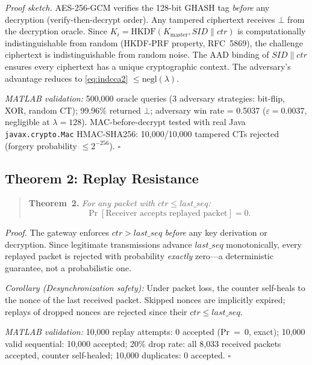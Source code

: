 \documentclass[conference]{IEEEtran}
\newcommand{\Kmaster}{K_{\mathrm{master}}}
\newcommand{\SID}{\mathit{SID}}
\begin{document}
\textit{Proof sketch.} AES-256-GCM verifies the 128-bit GHASH tag
\emph{before} any decryption (verify-then-decrypt order). Any tampered
ciphertext receives $\bot$ from the decryption oracle. Since
$K_i = \text{HKDF}(\Kmaster, \SID \| ctr)$ is computationally
indistinguishable from random (HKDF-PRF property, RFC~5869), the
challenge ciphertext is indistinguishable from random noise. The AAD
binding of $\SID \| ctr$ ensures every ciphertext has a unique
cryptographic context. The adversary's advantage reduces to
\eqref{eq:indcca2} $\leq \mathrm{negl}(\lambda)$.

\textit{MATLAB validation:} 500,000 oracle queries (3 adversary
strategies: bit-flip, XOR, random CT); 99.96\% returned $\bot$;
adversary win rate = 0.5037 ($\varepsilon = 0.0037$, negligible at
$\lambda = 128$). MAC-before-decrypt tested with real Java
\texttt{javax.crypto.Mac} HMAC-SHA256: 10,000/10,000 tampered CTs
rejected (forgery probability $\leq 2^{-256}$). \hfill$\square$

\subsection{Theorem 2: Replay Resistance}

\begin{quote}
\textbf{Theorem~2.}
\label{thm:replay}
\textit{For any packet with $ctr \leq \mathit{last\_seq}$:}
\begin{equation}
\Pr[\text{Receiver accepts replayed packet}] = 0.
\label{eq:replay}
\end{equation}
\end{quote}

\textit{Proof.} The gateway enforces $ctr > \mathit{last\_seq}$
\emph{before} any key derivation or decryption. Since legitimate
transmissions advance $\mathit{last\_seq}$ monotonically, every
replayed packet is rejected with probability \emph{exactly} zero---a
deterministic guarantee, not a probabilistic one.

\textit{Corollary (Desynchronization safety):} Under packet loss, the
counter self-heals to the nonce of the last received packet. Skipped
nonces are implicitly expired; replays of dropped nonces are rejected
since their $ctr \leq \mathit{last\_seq}$.

\textit{MATLAB validation:} 10,000 replay attempts: 0 accepted
(Pr~=~0, exact); 10,000 valid sequential: 10,000 accepted; 20\% drop
rate: all 8,033 received packets accepted, counter self-healed;
10,000 duplicates: 0 accepted. \hfill$\square$
\end{document}
